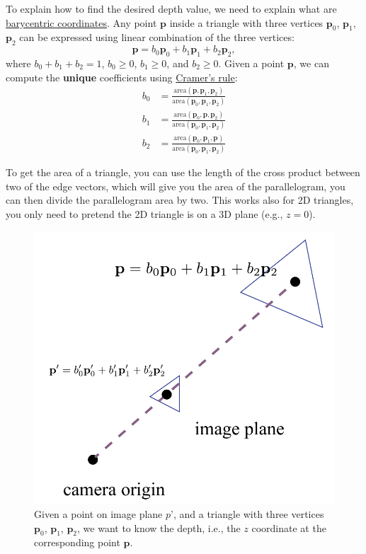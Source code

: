 To explain how to find the desired depth value, we need to explain what are \href{https://en.wikipedia.org/wiki/Barycentric_coordinate_system}{barycentric coordinates}. Any point $\mathbf{p}$ inside a triangle with three vertices $\mathbf{p}_0$, $\mathbf{p}_1$, $\mathbf{p}_2$ can be expressed using linear combination of the three vertices:
\begin{equation}
\mathbf{p} = b_0 \mathbf{p}_0 + b_1 \mathbf{p}_1 + b_2 \mathbf{p}_2,
\end{equation}
where $b_0 + b_1 + b_2 = 1$, $b_0 \geq 0$, $b_1 \geq 0$, and $b_2 \geq 0$. Given a point $\mathbf{p}$, we can compute the \textbf{unique} coefficients using \href{https://en.wikipedia.org/wiki/Cramer%27s_rule}{Cramer's rule}:
\begin{equation}
\begin{aligned}
b_0 &= \frac{\text{area}\left(\mathbf{p}, \mathbf{p}_1, \mathbf{p}_2\right)}{\text{area}\left(\mathbf{p}_0, \mathbf{p}_1, \mathbf{p}_2\right)} \\
b_1 &= \frac{\text{area}\left(\mathbf{p}_0, \mathbf{p}, \mathbf{p}_2\right)}{\text{area}\left(\mathbf{p}_0, \mathbf{p}_1, \mathbf{p}_2\right)} \\
b_2 &= \frac{\text{area}\left(\mathbf{p}_0, \mathbf{p}_1, \mathbf{p}\right)}{\text{area}\left(\mathbf{p}_0, \mathbf{p}_1, \mathbf{p}_2\right)}
\end{aligned}
\label{eq:barycentric_solve}
\end{equation}

To get the area of a triangle, you can use the length of the cross product between two of the edge vectors, which will give you the area of the parallelogram, you can then divide the parallelogram area by two. This works also for 2D triangles, you only need to pretend the 2D triangle is on a 3D plane (e.g., $z=0$).

\begin{figure}[h]
    \centering
    \includegraphics[width=0.5\linewidth]{imgs/perspective_interpolate.pdf}
    \caption{Given a point on image plane $p$', and a triangle with three vertices $\mathbf{p}_0$, $\mathbf{p}_1$, $\mathbf{p}_2$, we want to know the depth, i.e., the $z$ coordinate at the corresponding point $\mathbf{p}$.}
    \label{fig:perspective_interpolate}
\end{figure}

